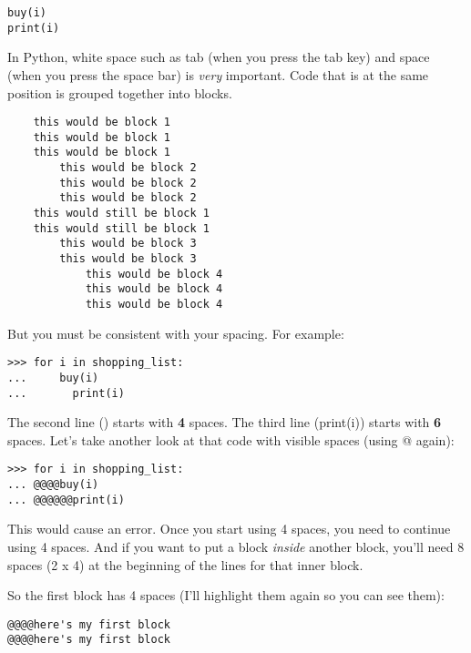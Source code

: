 \begin{listingignore}
\begin{verbatim}
buy(i)
print(i)
\end{verbatim}
\end{listingignore}

In Python, white space such as tab (when you press the tab key) and space (when you press the space bar) is \emph{very} important.  Code that is at the same position is grouped together into blocks.

\begin{listing}
\begin{verbatim}
	this would be block 1
	this would be block 1
	this would be block 1
	    this would be block 2
	    this would be block 2
	    this would be block 2
	this would still be block 1
	this would still be block 1
	    this would be block 3
	    this would be block 3
	        this would be block 4
	        this would be block 4
	        this would be block 4
\end{verbatim}
\end{listing}

But you must be consistent with your spacing.  For example:

\begin{listingignore}
\begin{verbatim}
>>> for i in shopping_list:
...     buy(i)
...       print(i)
\end{verbatim}
\end{listingignore}

The second line () starts with \textbf{4} spaces.  The third line (print(i)) starts with \textbf{6} spaces.  Let's take another look at that code with visible spaces (using @ again):

\begin{listingignore}
\begin{verbatim}
>>> for i in shopping_list:
... @@@@buy(i)
... @@@@@@print(i)
\end{verbatim}
\end{listingignore}

This would cause an error.  Once you start using 4 spaces, you need to continue using 4 spaces.  And if you want to put a block \emph{inside} another block, you'll need 8 spaces (2 x 4) at the beginning of the lines for that inner block.
\par
So the first block has 4 spaces (I'll highlight them again so you can see them):

\begin{listing}
\begin{verbatim}
@@@@here's my first block
@@@@here's my first block
\end{verbatim}
\end{listing}


